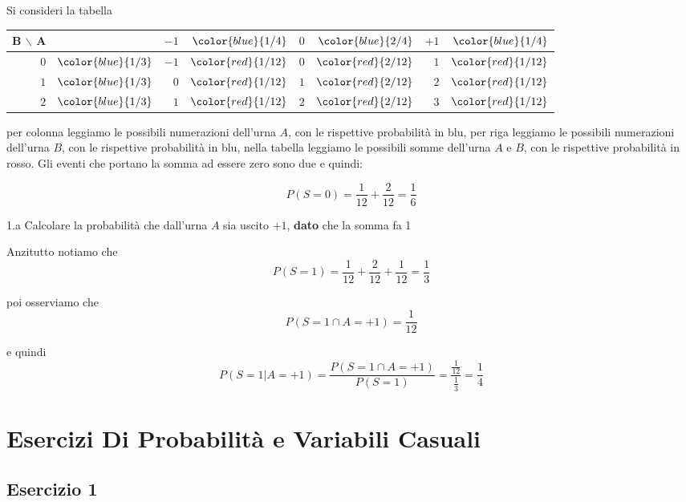\documentclass[
  11pt,
]{book}
\theoremstyle{mytheoremstyle}
\theoremstyle{mydefstyle}
\newenvironment{sol}
  {
  \begin{tcolorbox}[enhanced,breakable,arc=0.1mm,boxrule=1pt,colback=white,colframe=iblue,
  title=\bf \fontfamily{lmss}\selectfont \hspace{.5 cm} Soluzione,drop fuzzy shadow]

}{
\end{tcolorbox}
  }
\begin{document}
\begin{sol}
Si consideri la tabella

\begin{tabular}{r>{}r|rrrrrr}
\toprule
B $\backslash$ A &  & $-1$ & $\color{blue}{1/4}$ & $0$ & $\color{blue}{2/4}$ & $+1$ & $\color{blue}{1/4}$\\
\midrule
$0$ & $\color{blue}{1/3}$ & $-1$ & $\color{red}{1/{12}}$ & $0$ & $\color{red}{2/{12}}$ & $1$ & $\color{red}{1/{12}}$\\
$1$ & $\color{blue}{1/3}$ & $0$ & $\color{red}{1/{12}}$ & $1$ & $\color{red}{2/{12}}$ & $2$ & $\color{red}{1/{12}}$\\
$2$ & $\color{blue}{1/3}$ & $1$ & $\color{red}{1/{12}}$ & $2$ & $\color{red}{2/{12}}$ & $3$ & $\color{red}{1/{12}}$\\
\bottomrule
\end{tabular}

per colonna leggiamo le possibili numerazioni dell'urna \(A\), con le rispettive probabilità in blu,
per riga leggiamo le possibili numerazioni dell'urna \(B\), con le rispettive probabilità in blu,
nella tabella leggiamo le possibili somme dell'urna \(A\) e \(B\), con le rispettive probabilità in rosso.
Gli eventi che portano la somma ad essere zero sono due e quindi:

\[
P(S=0)=\frac 1{12}+\frac 2{12}=\frac 16
\]

\end{sol}

1.a Calcolare la probabilità che dall'urna \(A\) sia uscito \(\mbox{+1}\), \textbf{dato} che
la somma fa 1

\begin{sol}
Anzitutto notiamo che
\[
P(S=1)=\frac1{12}+\frac2{12}+\frac1{12}=\frac13
\]

poi osserviamo che
\[
P(S=1\cap A=\mbox{+1})=\frac1{12}
\]

e quindi
\[
P(S=1|A=\mbox{+1})=\frac{P(S=1\cap A=\mbox{+1})}{P(S=1)}=\frac{\frac{1}{12}}{\frac13}=\frac14
\]

\end{sol}

\chapter{Esercizi Di Probabilità e Variabili Casuali}\label{esercizi-di-probabilituxe0-e-variabili-casuali}

\section{Esercizio 1}\label{esercizio-1}
\end{document}
